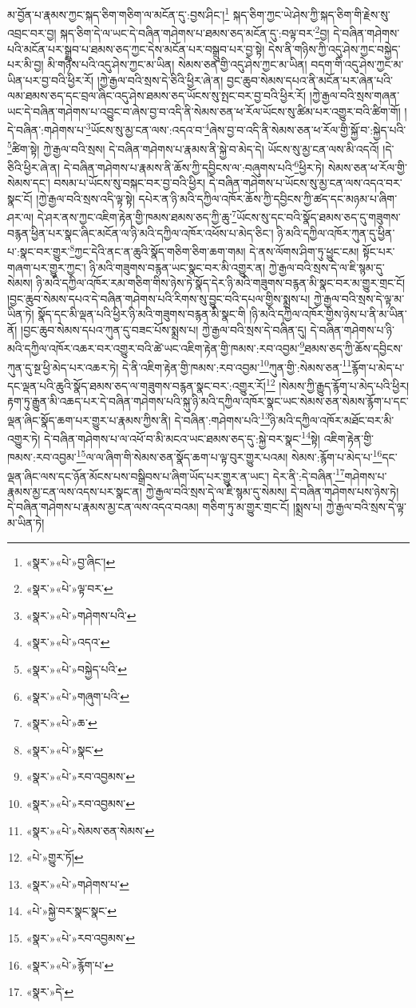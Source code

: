 མ་བྱོན་པ་རྣམས་ཀྱང་སྐད་ཅིག་གཅིག་ལ་མངོན་དུ་:བྱས་ཤིང་།\footnote{«སྣར་»«པེ་»བྱ་ཞིང་།} སྐད་ཅིག་ཀྱང་ཡེ་ཤེས་ཀྱི་སྐད་ཅིག་གི་རྗེས་སུ་འབྲང་བར་བྱ། སྐད་ཅིག་དེ་ལ་ཡང་དེ་བཞིན་གཤེགས་པ་ཐམས་ཅད་མངོན་དུ་:བལྟ་བར་\footnote{«སྣར་»«པེ་»ལྟ་བར་}བྱ། དེ་བཞིན་གཤེགས་པའི་མངོན་པར་སྒྲུབ་པ་ཐམས་ཅད་ཀྱང་དེས་མངོན་པར་བསྒྲུབ་པར་བྱ་སྟེ། དེས་ནི་གཉིས་ཀྱི་འདུ་ཤེས་ཀྱང་བསྐྱེད་པར་མི་བྱ། མི་གཉིས་པའི་འདུ་ཤེས་ཀྱང་མ་ཡིན། སེམས་ཅན་གྱི་འདུ་ཤེས་ཀྱང་མ་ཡིན། བདག་གི་འདུ་ཤེས་ཀྱང་མ་ཡིན་པར་བྱ་བའི་ཕྱིར་རོ། །ཀྱེ་རྒྱལ་བའི་སྲས་དེ་ཅིའི་ཕྱིར་ཞེ་ན། བྱང་ཆུབ་སེམས་དཔའ་ནི་མངོན་པར་ཞེན་པའི་ལམ་ཐམས་ཅད་དང་བྲལ་ཞིང་འདུ་ཤེས་ཐམས་ཅད་ཡོངས་སུ་སྤང་བར་བྱ་བའི་ཕྱིར་རོ། །ཀྱེ་རྒྱལ་བའི་སྲས་གཞན་ཡང་དེ་བཞིན་གཤེགས་པ་འབྱུང་བ་ཞེས་བྱ་བ་འདི་ནི་སེམས་ཅན་ཕ་རོལ་ཡོངས་སུ་ཚིམ་པར་འགྱུར་བའི་ཚིག་གོ། །དེ་བཞིན་:གཤེགས་པ་\footnote{«སྣར་»«པེ་»གཤེགས་པའི་}ཡོངས་སུ་མྱ་ངན་ལས་:འདའ་བ་\footnote{«སྣར་»«པེ་»འདའ་}ཞེས་བྱ་བ་འདི་ནི་སེམས་ཅན་ཕ་རོལ་གྱི་སྐྱོ་བ་:སྐྱེད་པའི་\footnote{«སྣར་»«པེ་»བསྐྱེད་པའི་}ཚིག་སྟེ། ཀྱེ་རྒྱལ་བའི་སྲས། དེ་བཞིན་གཤེགས་པ་རྣམས་ནི་སྐྱེ་བ་མེད་དེ། ཡོངས་སུ་མྱ་ངན་ལས་མི་འདའོ། །དེ་ཅིའི་ཕྱིར་ཞེ་ན། དེ་བཞིན་གཤེགས་པ་རྣམས་ནི་ཆོས་ཀྱི་དབྱིངས་ལ་:བཞུགས་པའི་\footnote{«སྣར་»«པེ་»གཞུག་པའི་}ཕྱིར་ཏེ། སེམས་ཅན་ཕ་རོལ་གྱི་སེམས་དང་། བསམ་པ་ཡོངས་སུ་བསྐང་བར་བྱ་བའི་ཕྱིར། དེ་བཞིན་གཤེགས་པ་ཡོངས་སུ་མྱ་ངན་ལས་འདའ་བར་སྣང་ངོ། །ཀྱེ་རྒྱལ་བའི་སྲས་འདི་ལྟ་སྟེ། དཔེར་ན་ཉི་མའི་དཀྱིལ་འཁོར་ཆོས་ཀྱི་དབྱིངས་ཀྱི་ཚད་དང་མཉམ་པ་ཞིག་ཤར་ལ། དེ་ཤར་ནས་ཀྱང་འཇིག་རྟེན་གྱི་ཁམས་ཐམས་ཅད་ཀྱི་ཆུ་\footnote{«སྣར་»«པེ་»ཆ་}ཡོངས་སུ་དང་བའི་སྣོད་ཐམས་ཅད་དུ་གཟུགས་བརྙན་ཕྱིན་པར་སྣང་ཞིང་མངོན་ལ་ཉི་མའི་དཀྱིལ་འཁོར་འཕོས་པ་མེད་ཅིང་། ཉི་མའི་དཀྱིལ་འཁོར་ཀུན་དུ་ཕྱིན་པ་:སྣང་བར་གྱུར་\footnote{«སྣར་»«པེ་»སྣང་}ཀྱང་དེའི་ནང་ན་ཆུའི་སྣོད་གཅིག་ཅིག་ཆག་གམ། དེ་ནས་ལོགས་ཤིག་ཏུ་ཕྱུང་ངམ། སྟོང་པར་གཞག་པར་གྱུར་ཀྱང་། ཉི་མའི་གཟུགས་བརྙན་ཡང་སྣང་བར་མི་འགྱུར་ན། ཀྱེ་རྒྱལ་བའི་སྲས་དེ་ལ་ཇི་སྙམ་དུ་སེམས། ཉི་མའི་དཀྱིལ་འཁོར་རམ་གཅིག་གིས་ཉེས་ཏེ་སྣོད་དེར་ཉི་མའི་གཟུགས་བརྙན་མི་སྣང་བར་མ་གྱུར་གྲང་ངོ། །བྱང་ཆུབ་སེམས་དཔའ་དེ་བཞིན་གཤེགས་པའི་རིགས་སུ་བྱུང་བའི་དཔལ་གྱིས་སྨྲས་པ། ཀྱེ་རྒྱལ་བའི་སྲས་དེ་ལྟ་མ་ཡིན་ཏེ། སྣོད་དང་མི་ལྡན་པའི་ཕྱིར་ཉི་མའི་གཟུགས་བརྙན་མི་སྣང་གི །ཉི་མའི་དཀྱིལ་འཁོར་གྱིས་ཉེས་པ་ནི་མ་ཡིན་ནོ། །བྱང་ཆུབ་སེམས་དཔའ་ཀུན་དུ་བཟང་པོས་སྨྲས་པ། ཀྱེ་རྒྱལ་བའི་སྲས་དེ་བཞིན་དུ། དེ་བཞིན་གཤེགས་པ་ཉི་མའི་དཀྱིལ་འཁོར་འཆར་བར་འགྱུར་བའི་ཚེ་ཡང་འཇིག་རྟེན་གྱི་ཁམས་:རབ་འབྱམ་\footnote{«སྣར་»«པེ་»རབ་འབྱམས་}ཐམས་ཅད་ཀྱི་ཆོས་དབྱིངས་ཀུན་དུ་སྔ་ཕྱི་མེད་པར་འཆར་ཏེ། དེ་ནི་འཇིག་རྟེན་གྱི་ཁམས་:རབ་འབྱམ་\footnote{«སྣར་»«པེ་»རབ་འབྱམས་}ཀུན་གྱི་:སེམས་ཅན་\footnote{«སྣར་»«པེ་»སེམས་ཅན་སེམས་}རྙོག་པ་མེད་པ་དང་ལྡན་པའི་ཆུའི་སྣོད་ཐམས་ཅད་ལ་གཟུགས་བརྙན་སྣང་བར་:འགྱུར་རོ།\footnote{«པེ་»གྱུར་ཏོ།} །སེམས་ཀྱི་རྒྱུད་རྙོག་པ་མེད་པའི་ཕྱིར། རྟག་ཏུ་རྒྱུན་མི་འཆད་པར་དེ་བཞིན་གཤེགས་པའི་སྐུ་ཉི་མའི་དཀྱིལ་འཁོར་སྣང་ཡང་སེམས་ཅན་སེམས་རྙོག་པ་དང་ལྡན་ཞིང་སྣོད་ཆག་པར་གྱུར་པ་རྣམས་ཀྱིས་ནི། དེ་བཞིན་:གཤེགས་པའི་\footnote{«སྣར་»«པེ་»གཤེགས་པ་}ཉི་མའི་དཀྱིལ་འཁོར་མཐོང་བར་མི་འགྱུར་ཏེ། དེ་བཞིན་གཤེགས་པ་ལ་འཕོ་བ་མི་མངའ་ཡང་ཐམས་ཅད་དུ་:སྐྱེ་བར་སྣང་\footnote{«པེ་»སྐྱེ་བར་སྣང་སྣང་}སྟེ། འཇིག་རྟེན་གྱི་ཁམས་:རབ་འབྱམ་\footnote{«སྣར་»«པེ་»རབ་འབྱམས་}ལ་ལ་ཞིག་གི་སེམས་ཅན་སྣོད་ཆག་པ་ལྟ་བུར་གྱུར་པའམ། སེམས་:རྙོག་པ་མེད་པ་\footnote{«སྣར་»«པེ་»རྙོག་པ་}དང་ལྡན་ཞིང་ལས་དང་ཉོན་མོངས་པས་བསྒྲིབས་པ་ཞིག་ཡོད་པར་གྱུར་ན་ཡང་། དེར་ནི་:དེ་བཞིན་\footnote{«སྣར་»དེ་}གཤེགས་པ་རྣམས་མྱ་ངན་ལས་འདས་པར་སྣང་ན། ཀྱེ་རྒྱལ་བའི་སྲས་དེ་ལ་ཇི་སྙམ་དུ་སེམས། དེ་བཞིན་གཤེགས་པས་ཉེས་ཏེ། དེ་བཞིན་གཤེགས་པ་རྣམས་མྱ་ངན་ལས་འདའ་བའམ། གཅིག་ཏུ་མ་གྱུར་གྲང་ངོ། །སྨྲས་པ། ཀྱེ་རྒྱལ་བའི་སྲས་དེ་ལྟ་མ་ཡིན་ཏེ། 